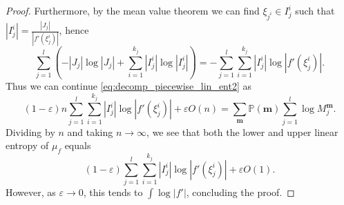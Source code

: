 \documentclass[11pt]{article}
\theoremstyle{definition}
\begin{document}
\begin{proof}
    Furthermore, by the mean value theorem we can find $\xi_{j^i}\in I_j^i$ such that $|I_j^i| = \frac{|J_j|}{|f'(\xi_j^i)|}$, hence
    $$\sum_{j=1}^{l}\left(-|J_j|\log |J_j| + \sum_{i=1}^{k_j}|I_j^i|\log |I_j^i|\right) = -\sum_{j=1}^{l}\sum_{i=1}^{k_j}|I_j^i|\log |f'(\xi_j^i)|.$$
    Thus we can continue \eqref{eq:decomp_piecewise_lin_ent2} as
    \begin{equation} \label{eq:decomp_piecewise_lin_ent3}
    (1-\varepsilon)n\sum_{j=1}^{l}\sum_{i=1}^{k_j}|I_j^i|\log |f'(\xi_j^i)|+\varepsilon O(n)= \sum_{\mathbf{m}}\mathbb{P}(\mathbf{m})\sum_{j=1}^l\log M_j^{\mathbf{m}}.
    \end{equation}
    Dividing by $n$ and taking $n\to\infty$, we see that both the lower and upper linear entropy of $\mu_f$ equals
    $$(1-\varepsilon)\sum_{j=1}^{l}\sum_{i=1}^{k_j}|I_j^i|\log |f'(\xi_j^i)|+\varepsilon O(1).$$
    However, as $\varepsilon\to 0$, this tends to $\int \log |f'|$, concluding the proof.
\end{proof}
\end{document}
